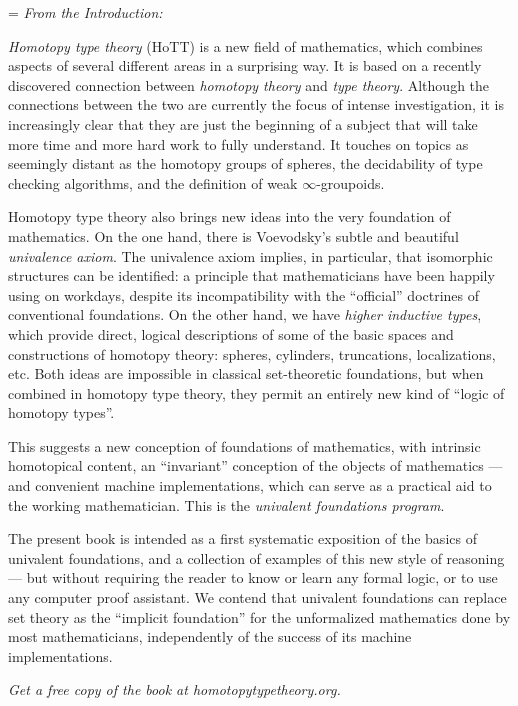 \pagestyle{empty}

\cleardoublepage
\clearpage

%
\vspace*{0.05\textheight}
{\large
\raggedright
\parindent=0pt
\parskip=\baselineskip
\emph{From the Introduction:}

\emph{Homotopy type theory} (HoTT) is a new field of mathematics,
which combines aspects of several different areas in a surprising way.
It is based on a recently discovered connection between \emph{homotopy
  theory} and \emph{type theory}. Although the connections between the
two are currently the focus of intense investigation, it is
increasingly clear that they are just the beginning of a subject that
will take more time and more hard work to fully understand. It touches
on topics as seemingly distant as the homotopy groups of spheres, the
decidability of type checking algorithms, and the definition of weak
$\infty$-groupoids.

Homotopy type theory also brings new ideas into the very foundation of
mathematics. On the one hand, there is Voevodsky's subtle and
beautiful \emph{univalence axiom}. The univalence axiom implies, in
particular, that isomorphic structures can be identified: a principle
that mathematicians have been happily using on workdays, despite its
incompatibility with the ``official'' doctrines of conventional
foundations. On the other hand, we have \emph{higher inductive types},
which provide direct, logical descriptions of some of the basic spaces
and constructions of homotopy theory: spheres, cylinders, truncations,
localizations, etc. Both ideas are impossible in classical
set-theoretic foundations, but when combined in homotopy type theory,
they permit an entirely new kind of ``logic of homotopy types''.

This suggests a new conception of foundations of mathematics, with
intrinsic homotopical content, an ``invariant'' conception of the
objects of mathematics --- and convenient machine implementations,
which can serve as a practical aid to the working mathematician. This
is the \emph{univalent foundations program}.

The present book is intended as a first systematic exposition of the
basics of univalent foundations, and a collection of examples of this
new style of reasoning --- but without requiring the reader to know or
learn any formal logic, or to use any computer proof assistant. We
contend that univalent foundations can replace set theory as the
``implicit foundation'' for the unformalized mathematics done by most
mathematicians, independently of the success of its machine
implementations.

\vfill

\begin{center}
  \emph{Get a free copy of the book at homotopytypetheory.org.}
\end{center}
}
\vspace*{0.02\textheight}

